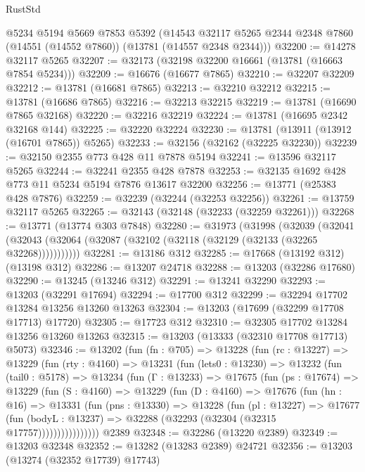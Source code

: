 \begin{lexlean}{RustStd}
\begin{coremodule}
    @5234
    @5194
    @5669
    @7853
    @5392
    (@14543 @32117 @5265 @2344 @2348 @7860 (@14551 (@14552 @7860)) (@13781 (@14557 @2348 @2344)))
@32200 := @14278 @32117 @5265
@32207 := @32173 (@32198 @32200 @16661 (@13781 (@16663 @7854 @5234)))
@32209 := @16676 (@16677 @7865)
@32210 := @32207 @32209
@32212 := @13781 (@16681 @7865)
@32213 := @32210 @32212
@32215 := @13781 (@16686 @7865)
@32216 := @32213 @32215
@32219 := @13781 (@16690 @7865 @32168)
@32220 := @32216 @32219
@32224 := @13781 (@16695 @2342 @32168 @144)
@32225 := @32220 @32224
@32230 := @13781 (@13911 (@13912 (@16701 @7865)) @5265)
@32233 := @32156 (@32162 (@32225 @32230))
@32239 := @32150 @2355 @773 @428 @11 @7878 @5194
@32241 := @13596 @32117 @5265
@32244 := @32241 @2355 @428 @7878
@32253 := @32135 @1692 @428 @773 @11 @5234 @5194 @7876 @13617 @32200
@32256 := @13771 (@25383 @428 @7876)
@32259 := @32239 (@32244 (@32253 @32256))
@32261 := @13759 @32117 @5265
@32265 := @32143 (@32148 (@32233 (@32259 @32261)))
@32268 := @13771 (@13774 @303 @7848)
@32280 := @31973
    (@31998
      (@32039
        (@32041 (@32043 (@32064 (@32087 (@32102 (@32118 (@32129 (@32133 (@32265 @32268)))))))))))
@32281 := @13186 @312
@32285 := @17668 (@13192 @312) (@13198 @312)
@32286 := @13207 @24718
@32288 := @13203 (@32286 @17680)
@32290 := @13245 (@13246 @312)
@32291 := @13241 @32290
@32293 := @13203 (@32291 @17694)
@32294 := @17700 @312
@32299 := @32294 @17702 @13284 @13256 @13260 @13263
@32304 := @13203 (@17699 (@32299 @17708 @17713) @17720)
@32305 := @17723 @312
@32310 := @32305 @17702 @13284 @13256 @13260 @13263
@32315 := @13203 (@13333 (@32310 @17708 @17713) @5073)
@32346 := @13202
    (fun (fn : @705) =>
    @13228
      (fun (rc : @13227) =>
      @13229
        (fun (rty : @4160) =>
        @13231
          (fun (lets0 : @13230) =>
          @13232
            (fun (tail0 : @5178) =>
            @13234
              (fun (Γ : @13233) =>
              @17675
                (fun (ps : @17674) =>
                @13229
                  (fun (S : @4160) =>
                  @13229
                    (fun (D : @4160) =>
                    @17676
                      (fun (hn : @16) =>
                      @13331
                        (fun (pns : @13330) =>
                        @13228
                          (fun (pl : @13227) =>
                          @17677
                            (fun (bodyL : @13237) =>
                            @32288 (@32293 (@32304 (@32315 @17757))))))))))))))))
    @2389
@32348 := @32286 (@13220 @2389)
@32349 := @13203 @32348
@32352 := @13282 (@13283 @2389) @24721
@32356 := @13203 (@13274 (@32352 @17739) @17743)

\end{coremodule}
\end{lexlean}

